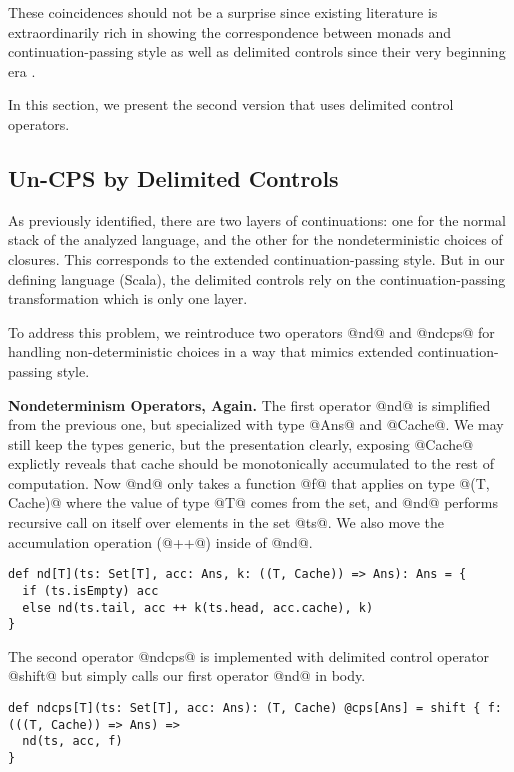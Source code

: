 \documentclass[acmsmall]{acmart}\settopmatter{}
\begin{document}
These coincidences should not be a surprise since existing literature is extraordinarily rich
in showing the correspondence between monads and continuation-passing style as well as
delimited controls since their very beginning era \cite{Danvy:1990:AC:91556.91622, wadler1992essence,
danvy1992representing, moggi1991notions}.

In this section, we present the second version that uses delimited control operators.

\subsection{Un-CPS by Delimited Controls} \label{uncps}

As previously identified, there are two layers of continuations: one for the normal stack 
of the analyzed language, and the other for the nondeterministic choices of closures.
This corresponds to the extended continuation-passing style.
But in our defining language (Scala), the delimited controls rely on the continuation-passing 
transformation which is only one layer.

To address this problem, we reintroduce two operators @nd@ and @ndcps@ for handling 
non-deterministic choices in a way that mimics extended continuation-passing style.

\textbf{Nondeterminism Operators, Again.}
The first operator @nd@ is simplified from the previous one, but specialized with type 
@Ans@ and @Cache@. We may still keep the types generic, but the presentation clearly, 
exposing @Cache@ explictly reveals that cache should be monotonically accumulated to 
the rest of computation. Now @nd@ only takes a function @f@ that applies on type 
@(T, Cache)@ where the value of type @T@ comes from the set, and @nd@ performs recursive 
call on itself over elements in the set @ts@. We also move the accumulation operation 
(@++@) inside of @nd@.

\begin{lstlisting}
def nd[T](ts: Set[T], acc: Ans, k: ((T, Cache)) => Ans): Ans = {
  if (ts.isEmpty) acc
  else nd(ts.tail, acc ++ k(ts.head, acc.cache), k)
}
\end{lstlisting}

The second operator @ndcps@ is implemented with delimited control operator 
@shift@ but simply calls our first operator @nd@ in body.

\begin{lstlisting}
def ndcps[T](ts: Set[T], acc: Ans): (T, Cache) @cps[Ans] = shift { f: (((T, Cache)) => Ans) =>
  nd(ts, acc, f)
}
\end{lstlisting}
\end{document}
